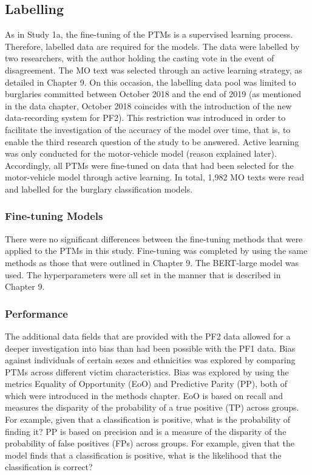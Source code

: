 \subsection{Labelling} As in Study 1a, the fine-tuning of the PTMs is a supervised learning process. Therefore, labelled data are required for the models. The data were labelled by two researchers, with the author holding the casting vote in the event of disagreement. The MO text was selected through an active learning strategy, as detailed in Chapter 9. On this occasion, the labelling data pool was limited to burglaries committed between October 2018 and the end of 2019 (as mentioned in the data chapter, October 2018 coincides with the introduction of the new data-recording system for PF2). This restriction was introduced in order to facilitate the investigation of the accuracy of the model over time, that is, to enable the third research question of the study to be answered. Active learning was only conducted for the motor-vehicle model (reason explained later). Accordingly, all PTMs were fine-tuned on data that had been selected for the motor-vehicle model through active learning. In total, 1,982 MO texts were read and labelled for the burglary classification models.

\subsubsection{Fine-tuning Models} There were no significant differences between the fine-tuning methods that were applied to the PTMs in this study. Fine-tuning was completed by using the same methods as those that were outlined in Chapter 9. The BERT-large model was used. The hyperparameters were all set in the manner that is described in Chapter 9.

\subsubsection{Performance} The additional data fields that are provided with the PF2 data allowed for a deeper investigation into bias than had been possible with the PF1 data. Bias against individuals of certain sexes and ethnicities was explored by comparing PTMs across different victim characteristics. Bias was explored by using the metrics Equality of Opportunity (EoO) and Predictive Parity (PP), both of which were introduced in the methods chapter. EoO is based on recall and measures the disparity of the probability of a true positive (TP) across groups. For example, given that a classification is positive, what is the probability of finding it? PP is based on precision and is a measure of the disparity of the probability of false positives (FPs) across groups. For example, given that the model finds that a classification is positive, what is the likelihood that the classification is correct?

